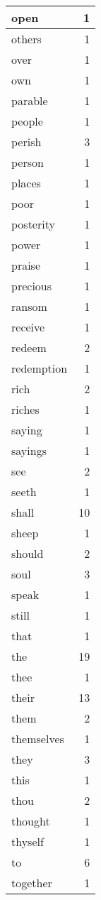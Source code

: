 \begin{center}
\begin{longtable}{l|r}
open & 1 \\ \hline
others & 1 \\ \hline
over & 1 \\ \hline
own & 1 \\ \hline
parable & 1 \\ \hline
people & 1 \\ \hline
perish & 3 \\ \hline
person & 1 \\ \hline
places & 1 \\ \hline
poor & 1 \\ \hline
posterity & 1 \\ \hline
power & 1 \\ \hline
praise & 1 \\ \hline
precious & 1 \\ \hline
ransom & 1 \\ \hline
receive & 1 \\ \hline
redeem & 2 \\ \hline
redemption & 1 \\ \hline
rich & 2 \\ \hline
riches & 1 \\ \hline
saying & 1 \\ \hline
sayings & 1 \\ \hline
see & 2 \\ \hline
seeth & 1 \\ \hline
shall & 10 \\ \hline
sheep & 1 \\ \hline
should & 2 \\ \hline
soul & 3 \\ \hline
speak & 1 \\ \hline
still & 1 \\ \hline
that & 1 \\ \hline
the & 19 \\ \hline
thee & 1 \\ \hline
their & 13 \\ \hline
them & 2 \\ \hline
themselves & 1 \\ \hline
they & 3 \\ \hline
this & 1 \\ \hline
thou & 2 \\ \hline
thought & 1 \\ \hline
thyself & 1 \\ \hline
to & 6 \\ \hline
together & 1 \\ \hline

\end{longtable}
\end{center}
